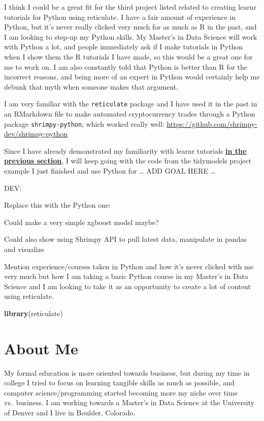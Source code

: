 \documentclass[
]{book}
\newenvironment{Shaded}{\begin{snugshade}}{\end{snugshade}}
\newcommand{\KeywordTok}[1]{\textcolor[rgb]{0.13,0.29,0.53}{\textbf{#1}}}
\newcommand{\NormalTok}[1]{#1}
\begin{document}
I think I could be a great fit for the third project listed related to creating learnr tutorials for Python using reticulate. I have a fair amount of experience in Python, but it's never really clicked very much for as much as R in the past, and I am looking to step-up my Python skills. My Master's in Data Science will work with Python a lot, and people immediately ask if I make tutorials in Python when I show them the R tutorials I have made, so this would be a great one for me to work on. I am also constantly told that Python is better than R for the incorrect reasons, and being more of an expert in Python would certainly help me debunk that myth when someone makes that argument.

I am very familiar with the \texttt{reticulate} package and I have used it in the past in an RMarkdown file to make automated cryptocurrency trades through a Python package \texttt{shrimpy-python}, which worked really well: \url{https://github.com/shrimpy-dev/shrimpy-python}

Since I have already demonstrated my familiarity with learnr tutorials \textbf{\protect\hyperlink{learnr}{in the previous section}}, I will keep going with the code from the tidymodels project example I just finished and use Python for \ldots{} ADD GOAL HERE \ldots{}

DEV:

Replace this with the Python one:

Could make a very simple xgboost model maybe?

Could also show using Shrimpy API to pull latest data, manipulate in pandas and visualize

Mention experience/courses taken in Python and how it's never clicked with me very much but how I am taking a basic Python course in my Master's in Data Science and I am looking to take it as an opportunity to create a lot of content using reticulate.

\begin{Shaded}
\begin{Highlighting}[]
\KeywordTok{library}\NormalTok{(reticulate)}
\end{Highlighting}
\end{Shaded}

\hypertarget{about-me}{%
\chapter{About Me}\label{about-me}}

My formal education is more oriented towards business, but during my time in college I tried to focus on learning tangible skills as much as possible, and computer science/programming started becoming more my niche over time vs.~business. I am working towards a Master's in Data Science at the University of Denver and I live in Boulder, Colorado.
\end{document}
